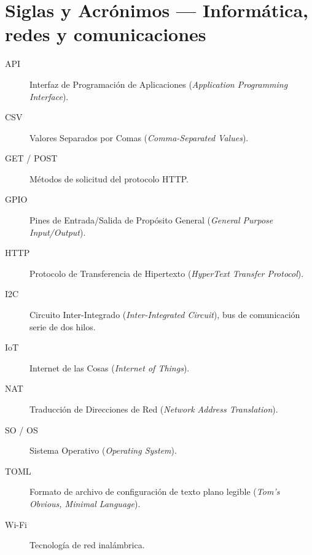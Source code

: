 \section*{Siglas y Acrónimos --- Informática, redes y comunicaciones}
\begin{description}
    \item[API] Interfaz de Programación de Aplicaciones (\textit{Application Programming Interface}).
    \item[CSV] Valores Separados por Comas (\textit{Comma-Separated Values}).
    \item[GET / POST] Métodos de solicitud del protocolo HTTP.
    \item[GPIO] Pines de Entrada/Salida de Propósito General (\textit{General Purpose Input/Output}).
    \item[HTTP] Protocolo de Transferencia de Hipertexto (\textit{HyperText Transfer Protocol}).
    \item[I2C] Circuito Inter-Integrado (\textit{Inter-Integrated Circuit}), bus de comunicación serie de dos hilos.
    \item[IoT] Internet de las Cosas (\textit{Internet of Things}).
    \item[NAT] Traducción de Direcciones de Red (\textit{Network Address Translation}).
    \item[SO / OS] Sistema Operativo (\textit{Operating System}).
    \item[TOML] Formato de archivo de configuración de texto plano legible (\textit{Tom's Obvious, Minimal Language}).
    \item[Wi-Fi] Tecnología de red inalámbrica.
\end{description}

